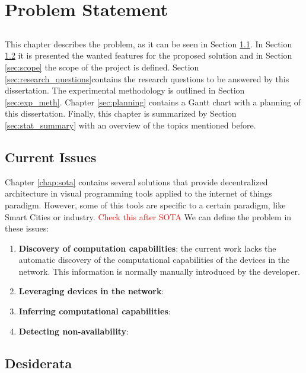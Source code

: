 \chapter{Problem Statement} \label{chap:problem_statement}

\section*{}

This chapter describes the problem, as it can be seen in Section \ref{sec:current_issues}. In Section \ref{sec:disiderata} it is presented the wanted features for the proposed solution and in Section \ref{sec:scope} the scope of the project is defined. Section \ref{sec:research_questions}contains the research questions to be answered by this dissertation. The experimental methodology is outlined in Section \ref{sec:exp_meth}. Chapter \ref{sec:planning} contains a Gantt chart with a planning of this dissertation. Finally, this chapter is summarized by Section \ref{sec:stat_summary} with an overview of the topics mentioned before.

\section{Current Issues}\label{sec:current_issues}

Chapter \ref{chap:sota} contains several solutions that provide decentralized architecture in visual programming tools applied to the internet of things paradigm. However, some of this tools are specific to a certain paradigm, like Smart Cities or industry. \textcolor{red}{Check this after SOTA}
We can define the problem in these issues:
\begin{enumerate}
    \item \textbf{Discovery of computation capabilities}: the current work lacks the automatic discovery of the computational capabilities of the devices in the network. This information is normally manually introduced by the developer.
    \item \textbf{Leveraging devices in the network}:
    \item \textbf{Inferring computational capabilities}: 
    \item \textbf{Detecting non-availability}:
\end{enumerate}

\section{Desiderata}\label{sec:disiderata}

